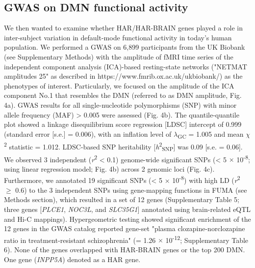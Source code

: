 \begin{refsection}
\subsection*{GWAS on DMN functional activity}
We then wanted to examine whether HAR/HAR-BRAIN genes played a role in inter-subject variation in default-mode functional activity in today's human population. We performed a GWAS on 6,899 participants from the UK Biobank \citep{sudlow2015uk} (see Supplementary Methods) with the amplitude of fMRI time series of the independent component analysis (ICA)-based resting-state networks ("NETMAT amplitudes 25"\citep{elliott2018genome} as described in https://www.fmrib.ox.ac.uk/ukbiobank/) as the phenotypes of interest. Particularly, we focused on the amplitude of the ICA component No.1 that resembles the DMN (referred to as DMN amplitude, Fig. 4a). GWAS results for all single-nucleotide polymorphisms (SNP) with minor allele frequency (MAF) > 0.005 were assessed (Fig. 4b). The quantile-quantile plot showed a linkage disequilibrium score regression [LDSC] intercept of 0.999 (standard error [s.e.] = 0.006), with an inflation level of $\lambda$\textsubscript{GC} = 1.005 and mean $\chi$\textsuperscript{2} statistic = 1.012. LDSC-based SNP heritability [\textit{h}\textsuperscript{2}\textsubscript{SNP}] was 0.09 [s.e. = 0.06]. We observed 3 independent (\textit{r}\textsuperscript{2} < 0.1) genome-wide significant SNPs (\pval < 5 $\times$ 10\textsuperscript{-8}; using linear regression model; Fig. 4b) across 2 genomic loci (Fig. 4c). Furthermore, we annotated 19 significant SNPs (\pval < 5 $\times$ 10\textsuperscript{-8}) with high LD (\textit{r}\textsuperscript{2} $\geq$ 0.6) to the 3 independent SNPs using gene-mapping functions in FUMA \citep{watanabe2017functional} (see Methods section), which resulted in a set of 12 genes (Supplementary Table 5; three genes [\textit{PLCE1}, \textit{NOC3L}, and \textit{SLC35G1}] annotated using brain-related eQTL and Hi-C mappings). Hypergeometric testing \citep{watanabe2017functional} showed significant enrichment of the 12 genes in the GWAS catalog \citep{buniello2018nhgri} reported gene-set "plasma clozapine-norclozapine ratio in treatment-resistant schizophrenia" (\pval = 1.26 $\times$ 10\textsuperscript{-12}; Supplementary Table 6). None of the genes overlapped with HAR-BRAIN genes or the top 200 DMN. One gene (\textit{INPP5A}) denoted as a HAR gene.


\end{refsection}
